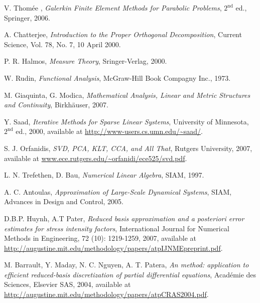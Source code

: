 \begin{thebibliography}{99}
 V. Thom\'{e}e , \emph{Galerkin Finite Element Methods for Parabolic Problems}, $2^\mathrm{nd}$ ed., Springer, 2006.


 A. Chatterjee, \emph{Introduction to the Proper Orthogonal Decomposition}, Current Science, Vol. 78, No. 7, 10 April 2000.

 P. R. Halmos, \emph{Measure Theory}, Sringer-Verlag, 2000.

 W. Rudin, \emph{Functional Analysis}, McGraw-Hill Book Compagny Inc., 1973.

  M. Giaquinta, G. Modica, \emph{Mathematical Analysis, Linear and Metric Structures and Continuity}, Birkh\"{a}user, 2007.

 Y. Saad, \emph{Iterative Methods for Sparse Linear Systems}, University of Minnesota, $2^\mathrm{nd}$ ed., 2000, available at \url{http://www-users.cs.umn.edu/~saad/}.

 S. J. Orfanidis, \emph{SVD, PCA, KLT, CCA, and All That}, Rutgers University, 2007, available at \url{www.ece.rutgers.edu/~orfanidi/ece525/svd.pdf}.

 L. N. Trefethen, D. Bau, \emph{Numerical Linear Algebra}, SIAM, 1997.

 A. C. Antoulas, \emph{Approximation of Large-Scale Dynamical Systems}, SIAM, Advances in Design and Control, 2005.


 D.B.P. Huynh, A.T Pater, \emph{Reduced basis approximation and a posteriori error estimates for stress intensity factors}, International Journal for Numerical Methods in Engineering, 72 (10): 1219-1259, 2007, available at \url{http://augustine.mit.edu/methodology/papers/atpIJNMEpreprint.pdf}.

 M. Barrault, Y. Maday, N. C. Nguyen, A. T. Patera, \emph{An  method: application to efficient reduced-basis discretization of partial differential equations}, Acad\'{e}mie des Sciences, Elsevier SAS, 2004, available at \url{http://augustine.mit.edu/methodology/papers/atpCRAS2004.pdf}.


\end{thebibliography}
